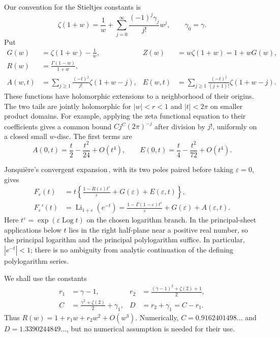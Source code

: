 \documentclass[11pt,a4paper]{article}
\numberwithin{equation}{section}
\theoremstyle{definition}
\theoremstyle{remark}
\DeclareMathOperator{\Li}{Li}
\DeclareMathOperator{\Log}{Log}
\begin{document}
Our convention for the Stieltjes constants is
\begin{equation}\label{cx:stieltjes}
 \zeta(1+w)=\frac1w+\sum_{j=0}^\infty
            \frac{(-1)^j\gamma_j}{j!}w^j,
 \qquad \gamma_0=\gamma.
\end{equation}
Put
\begin{align}
 G(w)&=\zeta(1+w)-\frac1w, &
 Z(w)&=w\zeta(1+w)=1+wG(w),\label{cx:GZ}\\
 R(w)&=\frac{\Gamma(1-w)}{1+w},\label{cx:R}\\
 A(w,t)&=\sum_{j\ge1}\frac{(-t)^j}{j!}\zeta(1+w-j),&
 E(w,t)&=\sum_{j\ge1}\frac{(-t)^j}{(j+1)!}\zeta(1+w-j).
 \label{cx:tails}
\end{align}
These functions have holomorphic extensions to a neighborhood of their
origins.  The two tails are jointly holomorphic for $|w|<r<1$ and
$|t|<2\pi$ on smaller product domains.  For example, applying the zeta
functional equation to their coefficients gives a common bound
$Cj^C(2\pi)^{-j}$ after division by $j!$, uniformly on a closed small
$w$-disc.  The first terms are
\begin{equation}\label{cx:tail-first}
 A(0,t)=\frac t2-\frac{t^2}{24}+O(t^4),\qquad
 E(0,t)=\frac t4-\frac{t^2}{72}+O(t^4).
\end{equation}

Jonqui\`ere's convergent expansion\,\cite{dlmf-poly}, with its two poles paired before
taking $\varepsilon=0$, gives
\begin{align}
 F_\varepsilon(t)
 &=t\left\{\frac{1-R(\varepsilon)t^\varepsilon}{\varepsilon}
                  +G(\varepsilon)+E(\varepsilon,t)\right\},
 \label{cx:F-normal}\\
 F_\varepsilon'(t)
 &=\Li_{1+\varepsilon}(e^{-t})
  =\frac{1-\Gamma(1-\varepsilon)t^\varepsilon}{\varepsilon}
                  +G(\varepsilon)+A(\varepsilon,t).
 \label{cx:derivative-normal}
\end{align}
Here $t^\varepsilon=\exp(\varepsilon\Log t)$ on the chosen logarithm
branch.  In the principal-sheet applications below $t$ lies in the right half-plane near a
positive real number, so the principal logarithm and the principal
polylogarithm suffice.  In particular, $|e^{-t}|<1$; there is no ambiguity
from analytic continuation of the defining polylogarithm series.

We shall use the constants
\begin{align}
 r_1&=\gamma-1,&
 r_2&=\frac{(\gamma-1)^2+\zeta(2)+1}{2},\label{cx:r12}\\
 C&=\frac{\gamma^2+\zeta(2)}2+\gamma_1,&
 D&=r_2+\gamma_1=C-r_1.\label{cx:CD}
\end{align}
Thus $R(w)=1+r_1w+r_2w^2+O(w^3)$.  Numerically,
$C=0.9162401498\ldots$ and $D=1.3390244849\ldots$, but no numerical
assumption is needed for their use.
\end{document}
